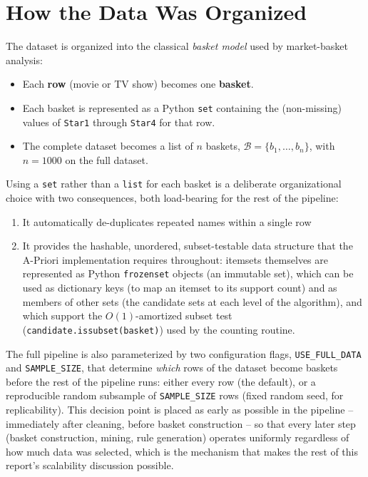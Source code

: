 \documentclass[11pt,a4paper]{article}
\begin{document}
\section{How the Data Was Organized}
\label{sec:organization}

The dataset is organized into the classical \emph{basket model} used by
market-basket analysis:

\begin{itemize}
    \item Each \textbf{row} (movie or TV show) becomes one \textbf{basket}.
    \item Each basket is represented as a Python \texttt{set} containing the
    (non-missing) values of \texttt{Star1} through \texttt{Star4} for that
    row.
    \item The complete dataset becomes a list of $n$ baskets,
    $\mathcal{B} = \{b_1, \dots, b_n\}$, with $n = 1000$ on the full dataset.
\end{itemize}

Using a \texttt{set} rather than a \texttt{list} for each basket is a
deliberate organizational choice with two consequences, both load-bearing for
the rest of the pipeline:

\begin{enumerate}
    \item It automatically de-duplicates repeated names within a single row
    \item It provides the hashable, unordered, subset-testable data structure
    that the A-Priori implementation requires throughout: itemsets themselves
    are represented as Python \texttt{frozenset} objects (an immutable set),
    which can be used as dictionary keys (to map an itemset to its support
    count) and as members of other sets (the candidate sets at each level of
    the algorithm), and which support the $O(1)$-amortized subset test
    (\texttt{candidate.issubset(basket)}) used by the counting routine.
\end{enumerate}

The full pipeline is also parameterized by two configuration flags,
\texttt{USE\_FULL\_DATA} and \texttt{SAMPLE\_SIZE}, that determine \emph{which}
rows of the dataset become baskets before the rest of the pipeline runs: either
every row (the default), or a reproducible random subsample of
\texttt{SAMPLE\_SIZE} rows (fixed random seed, for replicability). This
decision point is placed as early as possible in the pipeline -- immediately
after cleaning, before basket construction -- so that every later step (basket
construction, mining, rule generation) operates uniformly regardless of how
much data was selected, which is the mechanism that makes the rest of this
report's scalability discussion possible.
\end{document}
